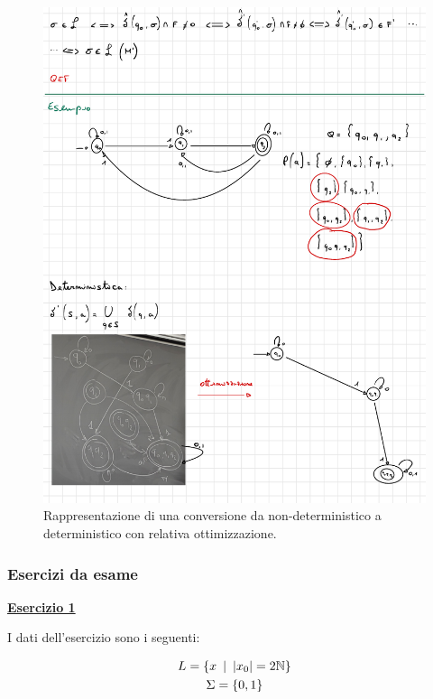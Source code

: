\documentclass[a4paper]{article}
\begin{document}
	\begin{figure}[!htp]
		\centering
		\includegraphics[width=1\textwidth]{img/grafo_ex2-sol.pdf}
		\caption{Rappresentazione di una conversione da non-deterministico a deterministico con relativa ottimizzazione.}
	\end{figure}

	\newpage
	
	\subsubsection{Esercizi da esame}
	
	\textcolor{Red3}{\textbf{\underline{Esercizio 1}}}\newline
	
	\noindent
	I dati dell'esercizio sono i seguenti:
	
	\begin{gather*}
		L = \left\{x \hspace{0.5em} | \hspace{0.5em} |x_{0}| = 2\mathbb{N}\right\} \\
		\Sigma = \left\{0, 1\right\}
	\end{gather*}\newline
	
\end{document}
